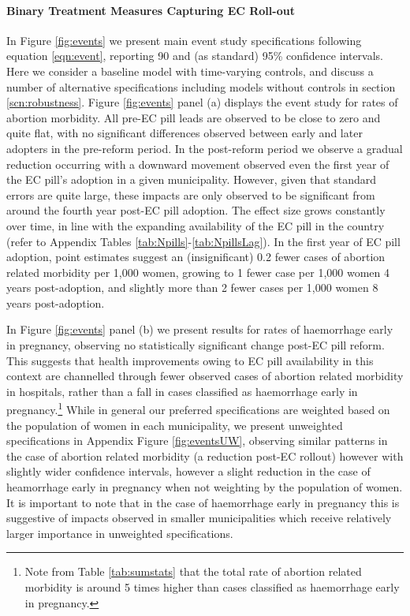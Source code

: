 \documentclass[12pt]{article}
\begin{document}
\begin{spacing}{1.9}
\paragraph{Binary Treatment Measures Capturing EC Roll-out}
In Figure \ref{fig:events} we present main event study specifications following equation \ref{eqn:event}, reporting 90 and (as standard) 95\% confidence intervals.
Here we consider a baseline model with time-varying controls, and discuss a number of alternative specifications including models without controls in section \ref{scn:robustness}.
Figure \ref{fig:events} panel (a) displays the event study for rates of abortion morbidity.  All pre-EC pill leads are observed to be close to zero and quite flat, with no significant differences observed between early and later adopters in the pre-reform period.  In the post-reform period we observe a gradual reduction occurring with a downward movement observed even the first year of the EC pill's adoption in a given municipality.  However, given that standard errors are quite large, these impacts are only observed to be significant from around the fourth year post-EC pill adoption.  The effect size grows constantly over time, in line with the expanding availability of the EC pill in the country (refer to Appendix Tables \ref{tab:Npills}-\ref{tab:NpillsLag}).  In the first year of EC pill adoption, point estimates suggest an (insignificant) 0.2 fewer cases of abortion related morbidity per 1,000 women, growing to 1 fewer case per 1,000 women 4 years post-adoption, and slightly more than 2 fewer cases per 1,000 women 8 years post-adoption. 

In Figure \ref{fig:events} panel (b) we present results for rates of haemorrhage early in pregnancy, observing no statistically significant change post-EC pill reform.  This suggests that health improvements owing to EC pill availability in this context are channelled through fewer observed cases of abortion related morbidity in hospitals, rather than a fall in cases classified as haemorrhage early in pregnancy.\footnote{Note from Table \ref{tab:sumstats} that the total rate of abortion related morbidity is around 5 times higher than cases classified as haemorrhage early in pregnancy.}  While in general our preferred specifications are weighted based on the population of women in each municipality, we present unweighted specifications in Appendix Figure \ref{fig:eventsUW}, observing similar patterns in the case of abortion related morbidity (a reduction post-EC rollout) however with slightly wider confidence intervals, however a slight reduction in the case of heamorrhage early in pregnancy when not weighting by the population of women.  It is important to note that in the case of haemorrhage early in pregnancy this is suggestive of impacts observed in smaller municipalities which receive relatively larger importance in unweighted specifications.



\end{spacing}
\end{document}
